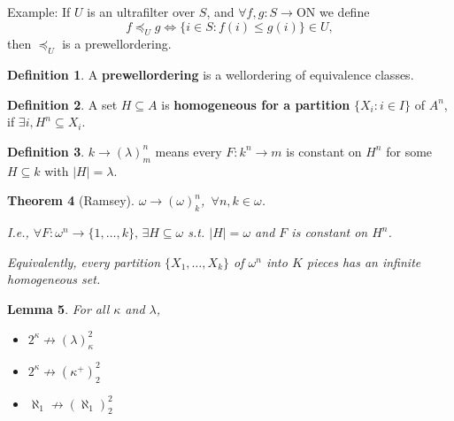 \documentclass[bibother]{asl}
\newtheorem{thm}{Theorem}[section]
\newtheorem{lem}[thm]{Lemma}
\theoremstyle{definition}
\newtheorem{defn}[thm]{Definition}
\theoremstyle{remark}
\newcommand{\on}{\text{ON}}
\begin{document}
Example: If $U$ is an ultrafilter over $S$, and
$\forall f,g:S\to\on$ we define 
$$f \preceq_U g \iff \{i\in S: f(i)\le g(i)\}\in U,$$ 
then $\preceq_U $ is a prewellordering. 

\begin{defn}
A \textbf{prewellordering} is a wellordering of equivalence classes. 
\end{defn}




\begin{defn}
A set $H\subseteq A$ is \textbf{homogeneous for a partition} $\{X_i:i\in I\}$ of $A^n$, if $\exists i, H^n\subseteq X_i$.
\end{defn}


\begin{defn}
$k \to (\lambda)^n_m$ means every $F:k^n\to m$ is constant on $H^n$ for some $H\subseteq k$ with $|H|=\lambda$.
\end{defn}


\begin{thm}[Ramsey]
$\omega\to(\omega)^n_k$, $\, \forall n,k\in\omega$. 

I.e., 
$\forall F:\omega^n\to\{1,\dots,k\},\, \exists H\subseteq\omega$ s.t. $|H|=\omega$  and $F$ is constant on $H^n$.

Equivalently, 
every partition $\{X_1,\dots,X_k\}$ of $\omega^n$ into $K$ pieces has an infinite homogeneous set.
\end{thm}


\begin{lem}
For all $\kappa$ and $\lambda$,
\begin{itemize}
\item[(a)] $2^\kappa \not\to (\lambda)^2_\kappa$
\item[(b)] $2^\kappa \not\to (\kappa^+)^2_2$
\item[(c)] $\aleph_1 \not\to (\aleph_1)^2_2$
\end{itemize}

\end{lem}
\end{document}
